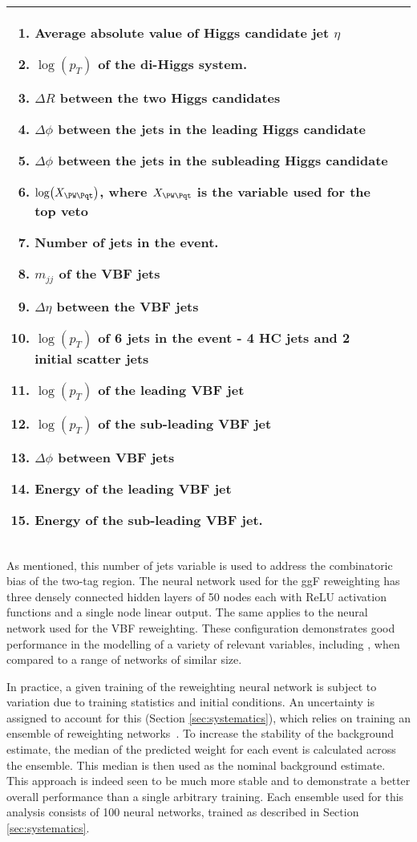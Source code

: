 \begin{table}[htbp]
\begin{tabular}{|p{7cm}|p{7cm}|}
\begin{enumerate}
		\item Average absolute value of Higgs candidate jet $\eta$
		\item $\log(p_T)$ of the di-Higgs system.
		\item $\Delta R$ between the two Higgs candidates
		\item $\Delta \phi$ between the jets in the leading Higgs candidate
		\item $\Delta \phi$ between the jets in the subleading Higgs candidate
		\item $\log(X_{\PW\Pqt})$, where $X_{\PW\Pqt}$ is the variable used for the top veto
		\item Number of jets in the event.	
		\item $m_{jj}$ of the VBF jets
		\item $\Delta \eta$ between the VBF jets
		\item $\log(p_T)$ of 6 jets in the event - 4 HC jets and 2 initial scatter jets
		\item $\log(p_T)$ of the leading VBF jet
		\item $\log(p_T)$ of the sub-leading VBF jet
		\item $\Delta \phi$ between VBF jets
		\item Energy of the leading VBF jet
		\item Energy of the sub-leading VBF jet. 
	\end{enumerate}\\
	\hline
	\end{tabular}
\end{table}

As mentioned, this number of jets variable is used to address the combinatoric 
bias of the two-tag region. The neural network used for the ggF reweighting has three 
densely connected hidden layers of 50 nodes each with ReLU activation functions and a single node 
linear output. The same applies to the neural network used for the VBF reweighting.
These configuration demonstrates good performance in the modelling 
of a variety of relevant variables, including \mhh, when compared to a 
range of networks of similar size.

In practice, a given training of the reweighting neural network is subject to variation
due to training statistics and initial conditions. An uncertainty is assigned to account
for this (Section \ref{sec:systematics}), which relies on training an ensemble of
reweighting networks~\cite{DeepEnsembles}. To increase the stability of the background estimate,
the median of the predicted weight for each event is calculated across the ensemble.
This median is then used as the nominal background estimate. This approach is indeed 
seen to be much more stable and to demonstrate a better overall performance than a 
single arbitrary training. Each ensemble used for this analysis consists of 100 
neural networks, trained as described in Section \ref{sec:systematics}.


